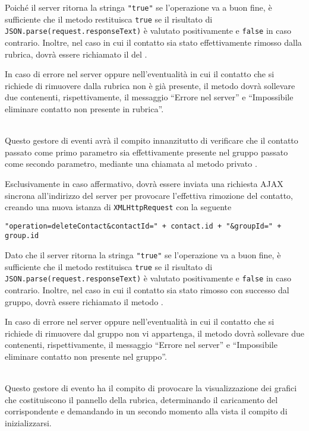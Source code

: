 \begin{description}
Poiché il server ritorna la stringa \verb'"true"' se l'operazione va a buon fine, è sufficiente che il metodo restituisca \verb'true' se il risultato di \verb'JSON.parse(request.responseText)' è valutato positivamente e \verb'false' in caso contrario. Inoltre, nel caso in cui il contatto sia stato effettivamente rimosso dalla rubrica, dovrà essere richiamato il  del .

In caso di errore nel server oppure nell'eventualità in cui il contatto che si richiede di rimuovere dalla rubrica non è già presente, il metodo dovrà sollevare due  contenenti, rispettivamente, il messaggio ``Errore nel server'' e ``Impossibile eliminare contatto non presente in rubrica''.

\item{}\\
Questo gestore di eventi avrà il compito innanzitutto di verificare che il contatto passato come primo parametro sia effettivamente presente nel gruppo passato come secondo parametro, mediante una chiamata al metodo privato .

Esclusivamente in caso affermativo, dovrà essere inviata una richiesta AJAX sincrona all'indirizzo del server per provocare l'effettiva rimozione del contatto, creando una nuova istanza di \verb'XMLHttpRequest' con la seguente 
\begin{verbatim}
"operation=deleteContact&contactId=" + contact.id + "&groupId=" + group.id
\end{verbatim}

Dato che il server ritorna la stringa \verb'"true"' se l'operazione va a buon fine, è sufficiente che il metodo restituisca \verb'true' se il risultato di \verb'JSON.parse(request.responseText)' è valutato positivamente e \verb'false' in caso contrario. Inoltre, nel caso in cui il contatto sia stato rimosso con successo dal gruppo, dovrà essere richiamato il metodo .

In caso di errore nel server oppure nell'eventualità in cui il contatto che si richiede di rimuovere dal gruppo non vi appartenga, il metodo dovrà sollevare due  contenenti, rispettivamente, il messaggio ``Errore nel server'' e ``Impossibile eliminare contatto non presente nel gruppo''.

\item{}\\
Questo gestore di evento ha il compito di provocare la visualizzazione dei  grafici che costituiscono il pannello della rubrica, determinando il caricamento del  corrispondente e demandando in un secondo momento alla vista il compito di inizializzarsi.


\end{description}
